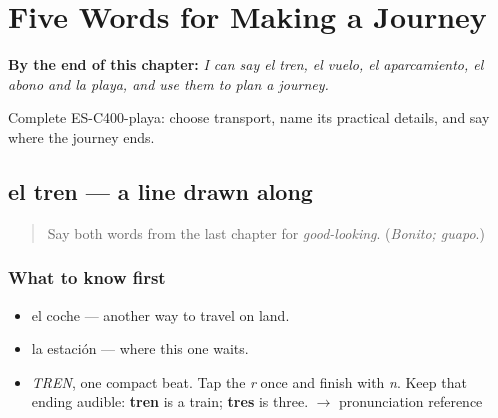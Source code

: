 
\chapter{Five Words for Making a Journey}
\label{ch:el-tren-y-la-playa}

\begin{chapteropening}
\textbf{By the end of this chapter:} \emph{I can say el tren, el vuelo, el aparcamiento, el abono and la playa, and use them to plan a journey.}

Complete ES-C400-playa: choose transport, name its practical details, and say where the journey ends.
\end{chapteropening}

\section[el tren]{el tren — a line drawn along}

\label{lesson:ES-C400-tren}



\begin{quote}
Say both words from the last chapter for \emph{good-looking}. (\emph{Bonito; guapo}.)
\end{quote}

\subsection*{What to know first}
\begin{itemize}
\raggedright
  \item el coche — another way to travel on land.
  \item la estación — where this one waits.
\end{itemize}

\begin{sounds}
\begin{itemize}
\raggedright
  \item \emph{TREN}, one compact beat. Tap the \emph{r} once and finish with \emph{n}. Keep that ending audible: \textbf{tren} is a train; \textbf{tres} is three. $\to$ pronunciation reference
\end{itemize}
\end{sounds}

